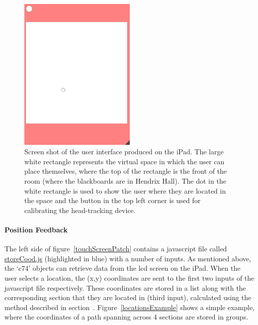 \documentclass[../../main.tex]{subfiles}
\begin{document}
			\begin{figure}[t]
				\centerline{\includegraphics[width=0.5\textwidth]{Sections/Implementation/Max/images/Max/UserInterface/UI_dot.png}}
				\caption{Screen shot of the user interface produced on the iPad. The large white rectangle represents the virtual space in which the user can place themselves, where the top of the rectangle is the front of the room (where the blackboards are in Hendrix Hall). The dot in the white rectangle is used to show the user where they are located in the space and the button in the top left corner is used for calibrating the head-tracking device.}
				\label{UIdot}
			\end{figure}

		\paragraph{Position Feedback}
			The left side of figure~\ref{touchScreenPatch} contains a javascript file called \href{http://lt669.github.io/code/javascript/html/storeCood.html}{storeCood.js} (highlighted in blue) with a number of inputs. As mentioned above, the `c74' objects can retrieve data from the lcd screen on the iPad. When the user selects a location, the (x,y) coordinates are sent to the first two inputs of the javascript file respectively. These coordinates are stored in a list along with the corresponding section that they are located in (third input), calculated using the method described in section~. Figure~\ref{locationsExample} shows a simple example, where the coordinates of a path spanning across 4 sections are stored in groups.
\end{document}
